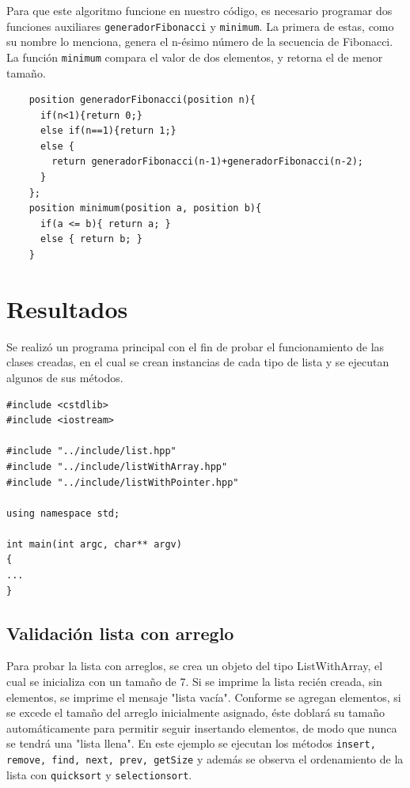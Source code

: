 Para que este algoritmo funcione en nuestro código, es necesario programar dos funciones auxiliares \texttt{generadorFibonacci} y \texttt{minimum}. La primera de estas, como su nombre lo menciona, genera el n-ésimo número de la secuencia de Fibonacci. La función \texttt{minimum} compara el valor de dos elementos, y retorna el de menor tamaño.

\begin{verbatim}
    position generadorFibonacci(position n){
      if(n<1){return 0;}
      else if(n==1){return 1;}
      else {
        return generadorFibonacci(n-1)+generadorFibonacci(n-2);
      }
    };
    position minimum(position a, position b){
      if(a <= b){ return a; }
      else { return b; }
    }
\end{verbatim}

\section{Resultados}

Se realizó un programa principal con el fin de probar el funcionamiento de las clases creadas, en el cual se crean instancias de cada tipo de lista y se ejecutan algunos de sus métodos. 

\begin{verbatim}
#include <cstdlib>
#include <iostream>

#include "../include/list.hpp"
#include "../include/listWithArray.hpp"
#include "../include/listWithPointer.hpp"

using namespace std;

int main(int argc, char** argv)
{
...
}
\end{verbatim}

\subsection{Validación lista con arreglo}

Para probar la lista con arreglos, se crea un objeto del tipo ListWithArray, el cual se inicializa con un tamaño de 7. Si se imprime la lista recién creada, sin elementos, se imprime el mensaje "lista vacía". Conforme se agregan elementos, si se excede el tamaño del arreglo inicialmente asignado, éste doblará su tamaño automáticamente para permitir seguir insertando elementos, de modo que nunca se tendrá una "lista llena". En este ejemplo se ejecutan los métodos \texttt{insert, remove, find, next, prev, getSize} y además se observa el ordenamiento de la lista con \texttt{quicksort} y \texttt{selectionsort}. 

